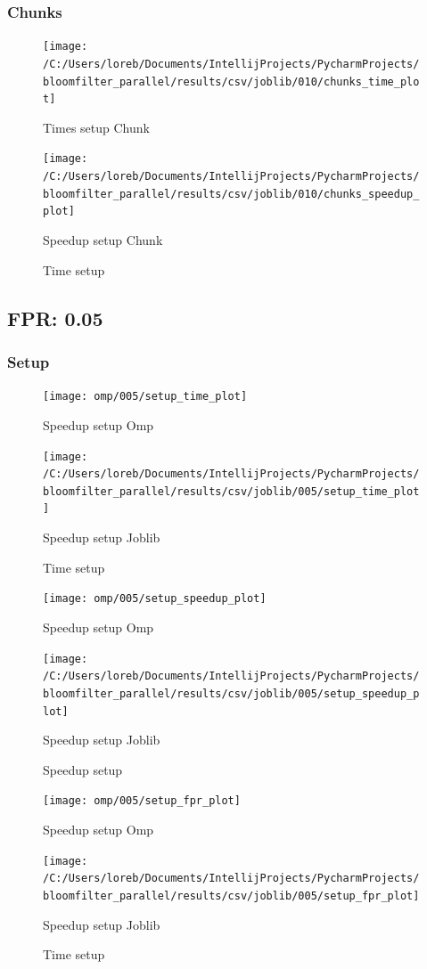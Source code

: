 \documentclass[11pt]{article}
\begin{document}
    \subsubsection{Chunks}\label{subsubsec:010-chunks}
    \begin{figure}[H]
        \centering
        \texttt{[image: /C:/Users/loreb/Documents/IntellijProjects/PycharmProjects/bloomfilter\_parallel/results/csv/joblib/010/chunks\_time\_plot]}
            \caption{Times setup Chunk}\label{fig:010-chunks_time}
        \endminipage\hfill
        \texttt{[image: /C:/Users/loreb/Documents/IntellijProjects/PycharmProjects/bloomfilter\_parallel/results/csv/joblib/010/chunks\_speedup\_plot]}
            \caption{Speedup setup Chunk}\label{fig:010-chunks_speedup}
        \endminipage\hfill
        \caption{Time setup}
    \end{figure}

    \subsection{FPR: 0.05}\label{subsec:fpr-005}
    \subsubsection{Setup}\label{subsubsec:fpr-005-setup}
    \begin{figure}[H]
        \centering
        \texttt{[image: omp/005/setup\_time\_plot]}
            \caption{Speedup setup Omp}\label{fig:005-setup_time_omp}
        \endminipage\hfill
        \texttt{[image: /C:/Users/loreb/Documents/IntellijProjects/PycharmProjects/bloomfilter\_parallel/results/csv/joblib/005/setup\_time\_plot]}
            \caption{Speedup setup Joblib}\label{fig:005-setup_time_joblib}
        \endminipage\hfill
        \caption{Time setup}
    \end{figure}
    \begin{figure}[H]
        \centering
        \texttt{[image: omp/005/setup\_speedup\_plot]}
            \caption{Speedup setup Omp}\label{fig:005-setup_speedup_omp}
        \endminipage\hfill
        \texttt{[image: /C:/Users/loreb/Documents/IntellijProjects/PycharmProjects/bloomfilter\_parallel/results/csv/joblib/005/setup\_speedup\_plot]}
            \caption{Speedup setup Joblib}\label{fig:005-setup_speedup_joblib}
        \endminipage\hfill
        \caption{Speedup setup}
    \end{figure}
    \begin{figure}[H]
        \centering
        \texttt{[image: omp/005/setup\_fpr\_plot]}
            \caption{Speedup setup Omp}\label{fig:005-setup_fpr_omp}
        \endminipage\hfill
        \texttt{[image: /C:/Users/loreb/Documents/IntellijProjects/PycharmProjects/bloomfilter\_parallel/results/csv/joblib/005/setup\_fpr\_plot]}
            \caption{Speedup setup Joblib}\label{fig:005-setup_fpr_joblib}
        \endminipage\hfill
        \caption{Time setup}
    \end{figure}
\end{document}
